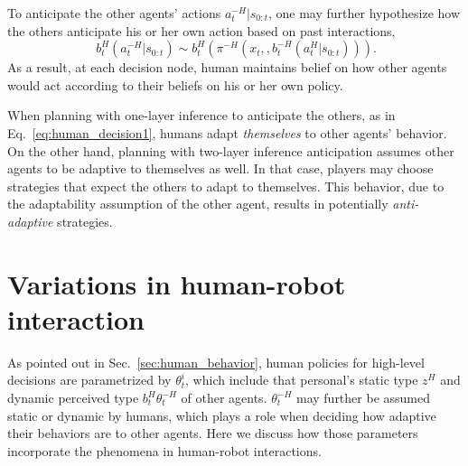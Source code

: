 \documentclass[letterpaper, 10 pt, conference]{ieeeconf}  %
\begin{document}
To anticipate the other agents' actions $a^{-H}_{t}|s_{0:t}$, one may further 
hypothesize how the others anticipate his or her own action based on past 
interactions, 
\begin{equation}~\label{eq:human_decision2}
b^H_t(a^{-H}_{t}|s_{0:t}) \sim  b^H_t(\pi^{-H} (x_t, ,b_{t}^{-H}(a^H_{t}|s_{0:t}))).
\end{equation}
As a result, at each decision node, human maintains belief on how other agents 
would act according to their beliefs on his or her own policy.

When planning with one-layer inference to anticipate the others, as in 
Eq.~\ref{eq:human_decision1}, humans adapt \textit{themselves} to other 
agents' behavior. On the other hand, planning with two-layer inference 
anticipation assumes other agents to be adaptive to themselves as well. In 
that case, players may choose strategies that expect the others to adapt 
to themselves. This behavior, due to the adaptability assumption of the other 
agent, results in potentially \textit{anti-adaptive} strategies. 
\section{Variations in human-robot interaction}
As pointed out in Sec.~\ref{sec:human_behavior}, human policies for high-level 
decisions are parametrized by $\theta^i_t$, which include that personal's static 
type $z^H$ and dynamic perceived type $b^H_t{\theta^{-H}_t}$ of other agents. 
$\theta^{-H}_t$ may further be assumed static or dynamic by humans, which 
plays a role when deciding how adaptive their behaviors are to other agents. 
Here we discuss how those parameters incorporate the 
phenomena in human-robot interactions. 
\end{document}
